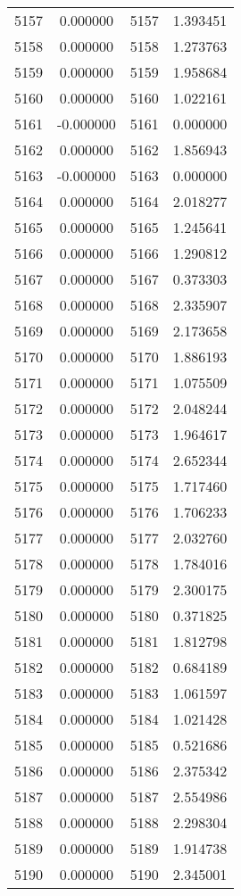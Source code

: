 \documentclass[12pt]{article}
\begin{document}
\begin{longtable}{@{}cccc@{}}
5157 & 0.000000 & 5157 & 1.393451 \\
5158 & 0.000000 & 5158 & 1.273763 \\
5159 & 0.000000 & 5159 & 1.958684 \\
5160 & 0.000000 & 5160 & 1.022161 \\
5161 & -0.000000 & 5161 & 0.000000 \\
5162 & 0.000000 & 5162 & 1.856943 \\
5163 & -0.000000 & 5163 & 0.000000 \\
5164 & 0.000000 & 5164 & 2.018277 \\
5165 & 0.000000 & 5165 & 1.245641 \\
5166 & 0.000000 & 5166 & 1.290812 \\
5167 & 0.000000 & 5167 & 0.373303 \\
5168 & 0.000000 & 5168 & 2.335907 \\
5169 & 0.000000 & 5169 & 2.173658 \\
5170 & 0.000000 & 5170 & 1.886193 \\
5171 & 0.000000 & 5171 & 1.075509 \\
5172 & 0.000000 & 5172 & 2.048244 \\
5173 & 0.000000 & 5173 & 1.964617 \\
5174 & 0.000000 & 5174 & 2.652344 \\
5175 & 0.000000 & 5175 & 1.717460 \\
5176 & 0.000000 & 5176 & 1.706233 \\
5177 & 0.000000 & 5177 & 2.032760 \\
5178 & 0.000000 & 5178 & 1.784016 \\
5179 & 0.000000 & 5179 & 2.300175 \\
5180 & 0.000000 & 5180 & 0.371825 \\
5181 & 0.000000 & 5181 & 1.812798 \\
5182 & 0.000000 & 5182 & 0.684189 \\
5183 & 0.000000 & 5183 & 1.061597 \\
5184 & 0.000000 & 5184 & 1.021428 \\
5185 & 0.000000 & 5185 & 0.521686 \\
5186 & 0.000000 & 5186 & 2.375342 \\
5187 & 0.000000 & 5187 & 2.554986 \\
5188 & 0.000000 & 5188 & 2.298304 \\
5189 & 0.000000 & 5189 & 1.914738 \\
5190 & 0.000000 & 5190 & 2.345001 \\

\end{longtable}
\end{document}
